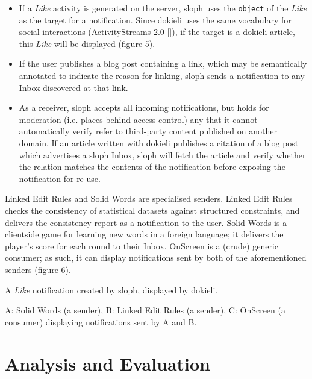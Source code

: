 \documentclass[a4paper]{llncs}
\begin{document}
                            \begin{itemize}
  \item If a {\em Like} activity is generated on the server, sloph uses the {\tt object} of the {\em Like} as the target for a notification. Since dokieli uses the same vocabulary for social interactions (\empty ActivityStreams 2.0 []), if the target is a dokieli article, this {\em Like} will be displayed (\empty figure 5).\item If the user publishes a blog post containing a link, which may be semantically annotated to indicate the reason for linking, sloph sends a notification to any Inbox discovered at that link.\item As a receiver, sloph accepts all incoming notifications, but holds for moderation (i.e. places behind access control) any that it cannot automatically verify refer to third-party content published on another domain. If an article written with dokieli publishes a citation of a blog post which advertises a sloph Inbox, sloph will fetch the article and verify whether the relation matches the contents of the notification before exposing the notification for re-use.
    \end{itemize}



\par \empty Linked Edit Rules and \empty Solid Words are specialised senders. Linked Edit Rules checks the consistency of statistical datasets against structured constraints, and delivers the consistency report as a notification to the user. Solid Words is a clientside game for learning new words in a foreign language; it delivers the player’s score for each round to their Inbox. \empty OnScreen is a (crude) generic consumer; as such, it can display notifications sent by both of the aforementioned senders (\empty figure 6).



                                A {\em Like} notification created by sloph, displayed by dokieli.




                                A: Solid Words (a sender), B: Linked Edit Rules (a sender), C: OnScreen (a consumer) displaying notifications sent by A and B.





                        \section{Analysis and Evaluation}
  \label{analysis-and-evaluation}
\end{document}
